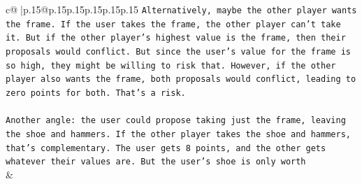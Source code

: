 \documentclass{article}
\begin{document}
{\begin{supertabular}{c@{$\;$}|p{.15\linewidth}@{}p{.15\linewidth}p{.15\linewidth}p{.15\linewidth}p{.15\linewidth}p{.15\linewidth}}
{{{\texttt{Alternatively, maybe the other player wants the frame. If the user takes the frame, the other player can't take it. But if the other player's highest value is the frame, then their proposals would conflict. But since the user's value for the frame is so high, they might be willing to risk that. However, if the other player also wants the frame, both proposals would conflict, leading to zero points for both. That's a risk. } \\
\\ 
\texttt{Another angle: the user could propose taking just the frame, leaving the shoe and hammers. If the other player takes the shoe and hammers, that's complementary. The user gets 8 points, and the other gets whatever their values are. But the user's shoe is only worth} \\
            }
        }
    }
    & \\ \\


\end{supertabular}}
\end{document}
